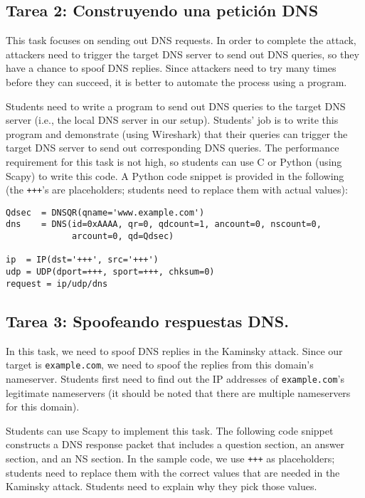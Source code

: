 \subsection{Tarea 2: Construyendo una petición DNS} 

This task focuses on sending out DNS requests. 
In order to complete the attack, attackers need to trigger the target 
DNS server to send out DNS queries, so they have a chance 
to spoof DNS replies. Since attackers need to try many times before they 
can succeed, it is better to automate the process using a program. 

Students need to write a program to send out DNS queries to the target DNS 
server (i.e., the local DNS server in our setup). 
Students' job is to write this program
and demonstrate (using Wireshark) that their queries can
trigger the target DNS server to send out corresponding DNS queries.
The performance requirement for this task is not high, so
students can use C or Python (using Scapy) to write this code. 
A Python code snippet is provided in the following (the 
\texttt{+++}'s are placeholders; students need to replace them
with actual values): 

\begin{lstlisting}
Qdsec  = DNSQR(qname='www.example.com')
dns    = DNS(id=0xAAAA, qr=0, qdcount=1, ancount=0, nscount=0,
             arcount=0, qd=Qdsec)

ip  = IP(dst='+++', src='+++')
udp = UDP(dport=+++, sport=+++, chksum=0)
request = ip/udp/dns
\end{lstlisting}
 


\subsection{Tarea 3: Spoofeando respuestas DNS.}   

In this task, we need to spoof DNS replies in the Kaminsky attack. 
Since our target is \texttt{example.com}, we need to spoof
the replies from this domain's nameserver. Students first need to 
find out the IP addresses of \texttt{example.com}'s legitimate 
nameservers (it should be noted that there are multiple 
nameservers for this domain).

Students can use Scapy to implement this task. The following 
code snippet constructs a DNS response packet that includes 
a question section, an answer section, and an NS section. 
In the sample code, we use \texttt{+++} as placeholders; 
students need to replace them with the correct values 
that are needed in the Kaminsky attack. Students need to explain
why they pick those values. 

